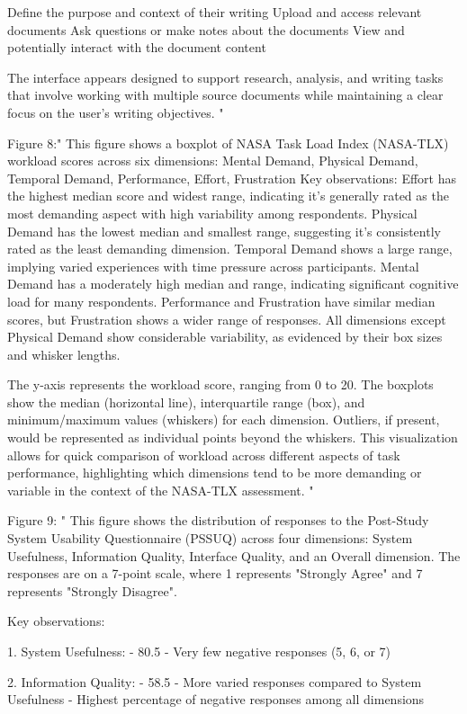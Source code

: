 Define the purpose and context of their writing
Upload and access relevant documents
Ask questions or make notes about the documents
View and potentially interact with the document content

The interface appears designed to support research, analysis, and writing tasks that involve working with multiple source documents while maintaining a clear focus on the user's writing objectives.
"

Figure 8:"
This figure shows a boxplot of NASA Task Load Index (NASA-TLX) workload scores across six dimensions: Mental Demand, Physical Demand, Temporal Demand, Performance, Effort, Frustration
Key observations:
Effort has the highest median score and widest range, indicating it's generally rated as the most demanding aspect with high variability among respondents.
Physical Demand has the lowest median and smallest range, suggesting it's consistently rated as the least demanding dimension.
Temporal Demand shows a large range, implying varied experiences with time pressure across participants.
Mental Demand has a moderately high median and range, indicating significant cognitive load for many respondents.
Performance and Frustration have similar median scores, but Frustration shows a wider range of responses.
All dimensions except Physical Demand show considerable variability, as evidenced by their box sizes and whisker lengths.

The y-axis represents the workload score, ranging from 0 to 20. The boxplots show the median (horizontal line), interquartile range (box), and minimum/maximum values (whiskers) for each dimension. Outliers, if present, would be represented as individual points beyond the whiskers.
This visualization allows for quick comparison of workload across different aspects of task performance, highlighting which dimensions tend to be more demanding or variable in the context of the NASA-TLX assessment.
"

Figure 9: "
This figure shows the distribution of responses to the Post-Study System Usability Questionnaire (PSSUQ) across four dimensions: System Usefulness, Information Quality, Interface Quality, and an Overall dimension. The responses are on a 7-point scale, where 1 represents "Strongly Agree" and 7 represents "Strongly Disagree".

Key observations:

1. System Usefulness:
   - 80.5%
   - Very few negative responses (5, 6, or 7)

2. Information Quality:
   - 58.5%
   - More varied responses compared to System Usefulness
   - Highest percentage of negative responses among all dimensions


